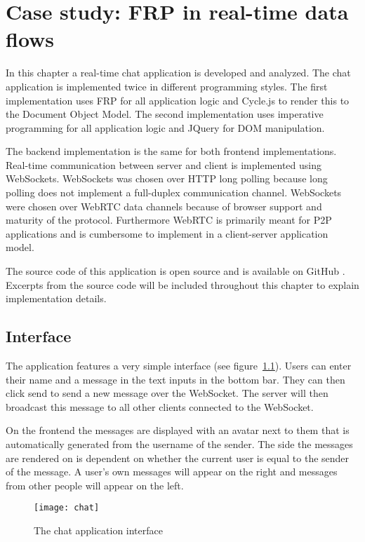 \chapter{Case study: FRP in real-time data flows} %
\label{sec:uitwerking}

In this chapter a real-time chat application is developed and analyzed. The chat application is implemented twice in different programming styles. The first implementation uses FRP for all application logic and Cycle.js to render this to the Document Object Model. The second implementation uses imperative programming for all application logic and JQuery for DOM manipulation.

The backend implementation is the same for both frontend implementations. Real-time communication between server and client is implemented using WebSockets. WebSockets was chosen over HTTP long polling because long polling does not implement a full-duplex communication channel. WebSockets were chosen over WebRTC data channels because of browser support and maturity of the protocol. Furthermore WebRTC is primarily meant for P2P applications and is cumbersome to implement in a client-server application model.

The source code of this application is open source and is available on GitHub \cite{chat-code}. Excerpts from the source code will be included throughout this chapter to explain implementation details. 

\section{Interface}

The application features a very simple interface (see figure~\ref{figure:chat}). Users can enter their name and a message in the text inputs in the bottom bar. They can then click send to send a new message over the WebSocket. The server will then broadcast this message to all other clients connected to the WebSocket. 

On the frontend the messages are displayed with an avatar next to them that is automatically generated from the username of the sender. The side the messages are rendered on is dependent on whether the current user is equal to the sender of the message. A user's own messages will appear on the right and messages from other people will appear on the left.

\begin{figure}[H]
	\centering
	\texttt{[image: chat]}
	\caption{The chat application interface}
	\label{figure:chat}
\end{figure}

